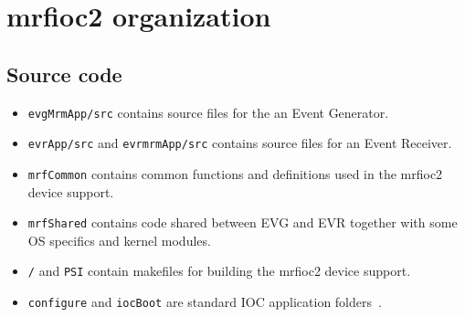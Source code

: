 \documentclass[12pt,a4paper]{article}
\let\stdsection\section
\renewcommand\section{\newpage\stdsection}
\begin{document}

\section{mrfioc2 organization}\label{sec:mrfioc2 organization}

\subsection{Source code}
\begin{itemize}
\item 
	\texttt{evgMrmApp/src} contains source files for the an Event Generator.
\item 
	\texttt{evrApp/src} and \texttt{evrmrmApp/src} contains source files for an Event Receiver.
\item 
	\texttt{mrfCommon} contains common functions and definitions used in the mrfioc2 device support. 
\item 
	\texttt{mrfShared} contains code shared between EVG and EVR together with some OS specifics and kernel modules.
\item 
	\texttt{/} and \texttt{PSI} contain makefiles for building the mrfioc2 device support.
\item 
	\texttt{configure} and \texttt{iocBoot} are standard IOC application folders~\cite{appDevGuide}.
\end{itemize}
\end{document}
